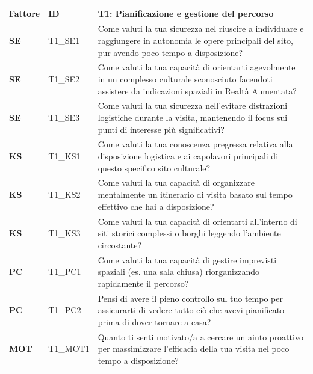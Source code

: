 \begin{table}[H]
    \centering
    \small
    \renewcommand{\arraystretch}{1.3}
    \begin{tabular}{
        |>{\centering\arraybackslash\bfseries}p{1.5cm}
        |>{\centering\arraybackslash}p{2.2cm}
        |>{\raggedright\arraybackslash}p{9.8cm}|
    }
        \hline
        \rowcolor{culturiaRed}
        \textcolor{culturiaWhite}{\textbf{Fattore}} &
        \textcolor{culturiaWhite}{\textbf{ID}} &
        \textcolor{culturiaWhite}{\textbf{T1: Pianificazione e gestione del percorso}} \\
        \hline
        \rowcolor{culturiaBeige}
        SE & T1\_SE1 & Come valuti la tua sicurezza nel riuscire a individuare e raggiungere in autonomia le opere principali del sito, pur avendo poco tempo a disposizione? \\
        \hline
        SE & T1\_SE2 & Come valuti la tua capacità di orientarti agevolmente in un complesso culturale sconosciuto facendoti assistere da indicazioni spaziali in Realtà Aumentata? \\
        \hline
        \rowcolor{culturiaBeige}
        SE & T1\_SE3 & Come valuti la tua sicurezza nell'evitare distrazioni logistiche durante la visita, mantenendo il focus sui punti di interesse più significativi? \\
        \hline
        KS & T1\_KS1 & Come valuti la tua conoscenza pregressa relativa alla disposizione logistica e ai capolavori principali di questo specifico sito culturale? \\
        \hline
        \rowcolor{culturiaBeige}
        KS & T1\_KS2 & Come valuti la tua capacità di organizzare mentalmente un itinerario di visita basato sul tempo effettivo che hai a disposizione? \\
        \hline
        KS & T1\_KS3 & Come valuti la tua capacità di orientarti all'interno di siti storici complessi o borghi leggendo l'ambiente circostante? \\
        \hline
        \rowcolor{culturiaBeige}
        PC & T1\_PC1 & Come valuti la tua capacità di gestire imprevisti spaziali (es. una sala chiusa) riorganizzando rapidamente il percorso? \\
        \hline
        PC & T1\_PC2 & Pensi di avere il pieno controllo sul tuo tempo per assicurarti di vedere tutto ciò che avevi pianificato prima di dover tornare a casa? \\
        \hline
        \rowcolor{culturiaBeige}
        MOT & T1\_MOT1 & Quanto ti senti motivato/a a cercare un aiuto proattivo per massimizzare l'efficacia della tua visita nel poco tempo a disposizione? \\

\end{tabular}
\end{table}
